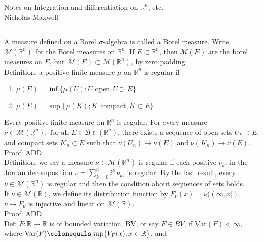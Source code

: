 \documentclass[12pt]{article}
\newcommand{\fall}[0] { \textrm{ for all } }
\newcommand{\reals}[0] { \mathbb{R}}
\newcommand{\M}[0] { \mathcal{M} }
\newcommand{\Bl}[0] { \mathcal{B} \ell }
\newcommand{\rarw}[0] { \rightarrow }
\newcommand{ \defeq }[0] { \colonequals }
\newcommand{ \Var } { \textrm{Var} }
\begin{document}
\begin{flushleft}
Notes on Integration and differentiation on $\reals^n$, etc. \\
Nicholas Maxwell\\
\end{flushleft}

\begin{flushleft}
\addvspace{5pt} \hrule
\end{flushleft}	

A measure defined on a Borel $\sigma$-algebra is called a Borel measure. Write $\M(\reals^n)$ for the Borel measures on $\reals^n$. If $E \subset \reals^n$, then $\M(E)$ are the borel measures on $E$, but $\M(E) \subset \M(\reals^n)$, by zero padding. \\

Definition: a positive finite measure $\mu$ on $\reals^n$ is regular if

\begin{enumerate}
\item
$\mu(E) = \inf \{ \mu(U) ; U \textrm{ open}, U \supset E \}$
\item
$\mu(E) = \sup \{ \mu(K) ; K \textrm{ compact}, K \subset E \}$
\end{enumerate}

Every positive finite measure on $\reals^n$ is regular. For every measure $\nu \in \M(\reals^n), \fall E \in \Bl(\reals^n)$, there exists a sequence of open sets $U_k \supset E$, and compact sets $K_n \subset E$ such that $\nu(U_n) \rarw \nu(E)$ and $\nu(K_n) \rarw \nu(E)$. \\

\noindent
Proof: ADD \\

Definition: we say a measure $\nu \in \M(\reals^n)$ is regular if each positive $\nu_k$, in the Jordan decomposition $\nu = \sum_{k=0}^3 i^k \, \nu_k$, is regular. By the last result, every $\nu \in \M(\reals^n)$ is regular and then the condition about sequences of sets holds. \\

If $\nu \in \M(\reals)$, we define its distribution function by $F_\nu (x) = \nu((\infty,x])$. $\nu \mapsto F_\nu$ is injective and linear on $\M(\reals)$. \\

\noindent
Proof: ADD \\

Def: $F: \reals \rarw \reals$ is of bounded variation, BV, or say $F \in BV$, if $\Var(F) < \infty$, where $\Var(F) \defeq \sup\{ V_F(x); x \in \reals \}$, and 
\end{document}
